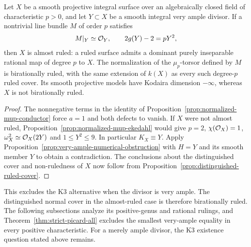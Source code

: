 

\begin{corollary}\label{cor:very-ample-equality-almost-ruled}
Let $X$ be a smooth projective integral surface over an
algebraically closed field of characteristic $p>0$, and let
$Y\subset X$ be a smooth integral very ample divisor. If a
nontrivial line bundle $M$ of order $p$ satisfies
\[
 M|_Y\simeq\mathcal O_Y,\qquad 2g(Y)-2=pY^2,
\]
then $X$ is almost ruled: a ruled surface admits a dominant
purely inseparable rational map of degree $p$ to $X$.
The normalization of the $\mu_p$-torsor defined by $M$ is
birationally ruled, with the same extension of $k(X)$ as
every such degree-$p$ ruled cover. Its smooth projective
models have Kodaira dimension $-\infty$, whereas $X$ is
not birationally ruled.
\end{corollary}

\begin{proof}
The nonnegative terms in the identity of
Proposition~\ref{prop:normalized-mup-conductor} force $a=1$
and both defects to vanish. If $X$ were not almost ruled,
Proposition~\ref{prop:normalized-mup-ekedahl} would give
$p=2$, $\chi(\mathcal O_X)=1$, $\omega_X^2\simeq\mathcal O_X(2Y)$
and $1\leq Y^2\leq9$. In particular $K_X\equiv Y$.
Apply Proposition~\ref{prop:very-ample-numerical-obstruction}
with $H=Y$ and its smooth member $Y$ to obtain a contradiction.
The conclusions about the distinguished cover and non-ruledness
of $X$ now follow from
Proposition~\ref{prop:distinguished-ruled-cover}.
\end{proof}

This excludes the K3 alternative when the divisor is very ample.
The distinguished normal cover in the almost-ruled case is therefore
birationally ruled. The following subsections analyze its positive-genus
and rational rulings, and Theorem~\ref{thm:strict-picard-all} excludes
the smallest very-ample equality in every positive characteristic. For a merely
ample divisor, the K3 existence question stated above remains.
